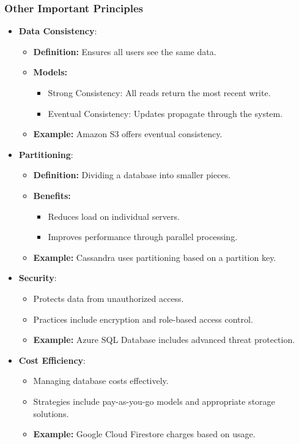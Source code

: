 \documentclass[aspectratio=169]{beamer}
\begin{document}
\begin{frame}[fragile]
    \frametitle{Other Important Principles}
    \begin{itemize}
        \item \textbf{Data Consistency}:
        \begin{itemize}
            \item \textbf{Definition:} Ensures all users see the same data.
            \item \textbf{Models:}
            \begin{itemize}
                \item Strong Consistency: All reads return the most recent write.
                \item Eventual Consistency: Updates propagate through the system.
            \end{itemize}
            \item \textbf{Example:} Amazon S3 offers eventual consistency.
        \end{itemize}

        \item \textbf{Partitioning}:
        \begin{itemize}
            \item \textbf{Definition:} Dividing a database into smaller pieces.
            \item \textbf{Benefits:}
            \begin{itemize}
                \item Reduces load on individual servers.
                \item Improves performance through parallel processing.
            \end{itemize}
            \item \textbf{Example:} Cassandra uses partitioning based on a partition key.
        \end{itemize}
        
        \item \textbf{Security}:
        \begin{itemize}
            \item Protects data from unauthorized access.
            \item Practices include encryption and role-based access control.
            \item \textbf{Example:} Azure SQL Database includes advanced threat protection.
        \end{itemize}

        \item \textbf{Cost Efficiency}:
        \begin{itemize}
            \item Managing database costs effectively.
            \item Strategies include pay-as-you-go models and appropriate storage solutions.
            \item \textbf{Example:} Google Cloud Firestore charges based on usage.
        \end{itemize}
    \end{itemize}
\end{frame}
\end{document}
